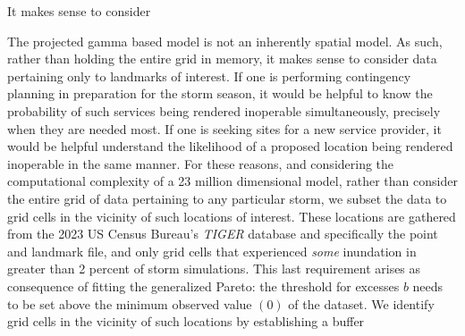 It makes sense to consider

The projected gamma based model is not an inherently spatial model.  As such, rather than holding the entire grid in memory, it makes sense to consider data pertaining only to landmarks of interest.    If one is performing contingency planning in preparation for the storm season, it would be helpful to know the probability of such services being rendered inoperable simultaneously, precisely when they are needed most.  If one is seeking sites for a new service provider, it would be helpful understand the likelihood of a proposed location being rendered inoperable in the same manner.  For these reasons, and considering the computational complexity of a 23 million dimensional model, rather than consider the entire grid of data pertaining to any particular storm, we subset the data to grid cells in the vicinity of such locations of interest.  These locations are gathered from the 2023 US Census Bureau's \emph{TIGER} database \needcite and specifically the point and landmark file, and only grid cells that experienced \emph{some} inundation in greater than 2  percent of storm simulations.   This last requirement arises as consequence of fitting the generalized Pareto: the threshold for excesses $b$ needs to be set above the minimum observed value $(0)$ of the dataset.    We identify grid cells in the vicinity of such locations by establishing a buffer 







